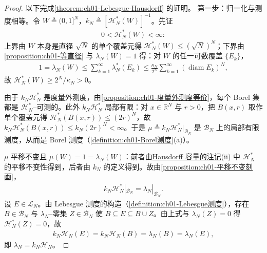 \documentclass[../../main.tex]{subfiles}%
\begin{document}
\begin{proof}
以下完成\cref{theorem:ch01-Lebesgue-Hausdorff} 的证明。
第一步：归一化与测度相等。令 $W\triangleq(0,1]^N$，$k_N\triangleq\left[\mathcal{H}_N^*(W)\right]^{-1}$。先证
\begin{align*}
0<\mathcal{H}_N^*(W)<\infty :
\end{align*}
上界由 $W$ 本身是直径 $\sqrt N$ 的单个覆盖元得 $\mathcal{H}_N^*(W)\leqslant(\sqrt N)^N$；下界由\cref{proposition:ch01-等直径} 与 $\lambda_N(W)=1$ 得：对 $W$ 的任一可数覆盖 $\{E_k\}$，
\begin{align*}
1=\lambda_N(W)\leqslant\sum_{k=1}^\infty\lambda_N^*(E_k)\leqslant\frac{\kappa_N}{2^N}\sum_{k=1}^\infty\left(\operatorname{diam}E_k\right)^N,
\end{align*}
故 $\mathcal{H}_N^*(W)\geqslant2^N/\kappa_N>0$。

由于 $k_N\mathcal{H}_N^*$ 是度量外测度，由\cref{proposition:ch01-度量外测度等价}，每个 Borel 集都是 $\mathcal{H}_N^*$--可测的。此外 $k_N\mathcal{H}_N^*$ 局部有限：对 $x\in\mathbb{R}^N$ 与 $r>0$，把 $B(x,r)$ 取作单个覆盖元得 $\mathcal{H}_N^*(B(x,r))\leqslant(2r)^N$，故 $k_N\mathcal{H}_N^*(B(x,r))\leqslant k_N(2r)^N<\infty$。于是 $\mu\triangleq k_N\mathcal{H}_N^*|_{\mathcal{B}_N}$ 是 $\mathcal{B}_N$ 上的局部有限测度，从而是 Borel 测度（\cref{definition:ch01-Borel测度}(a)）。

$\mu$ 平移不变且 $\mu(W)=1=\lambda_N(W)$：前者由\hyperref[remark:ch01-Hausdorff性质]{Hausdorff 容量的注记}(ii) 中 $\mathcal{H}_N^*$ 的平移不变性得到，后者由 $k_N$ 的定义得到。故由\cref{proposition:ch01-平移不变刻画}，
\begin{align*}
k_N\mathcal{H}_N^*|_{\mathcal{B}_N}=\lambda_N|_{\mathcal{B}_N}.
\end{align*}
设 $E\in\mathcal{L}_N$。由 Lebesgue 测度的构造（\cref{definition:ch01-Lebesgue测度}），存在 $B\in\mathcal{B}_N$ 与 $\lambda_N$--零集 $Z\in\mathcal{B}_N$ 使 $B\subseteq E\subseteq B\cup Z$。由上式与 $\lambda_N(Z)=0$ 得 $\mathcal{H}_N^*(Z)=0$，故
\begin{align*}
k_N\mathcal{H}_N(E)=k_N\mathcal{H}_N(B)=\lambda_N(B)=\lambda_N(E),
\end{align*}
即 $\lambda_N=k_N\mathcal{H}_N$。


\end{proof}
\end{document}
